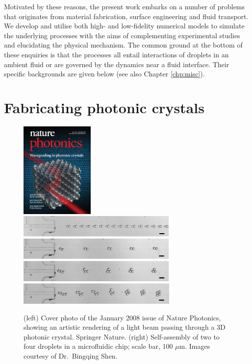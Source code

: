 Motivated by these reasons, the present work embarks on a number of problems that originates from material fabrication, surface engineering and fluid transport.
We develop and utilise both high- and low-fidelity numerical models to simulate the underlying processes with the aims of complementing experimental studies and elucidating the physical mechanism.
The common ground at the bottom of these enquiries is that the processes all entail interactions of droplets in an ambient fluid or are governed by the dynamics near a fluid interface.
Their specific backgrounds are given below (see also Chapter \ref{chp:misc}).



\section{Fabricating photonic crystals}

\begin{figure}%
  \centering
  \includegraphics[height=4.73cm]{photonics_cover.jpg}
  \includegraphics[height=4.73cm]{flow-assist1.png}
  \caption{(left) Cover photo of the January 2008 issue of Nature Photonics, showing an artistic rendering of a light beam passing through a 3D photonic crystal. \textcopyright \enspace Springer Nature. (right) Self-assembly of two to four droplets in a microfluidic chip; scale bar, 100 $\mu$m. Images courtesy of Dr.\ Bingqing Shen.}
  \label{fig:photonic-flow}
\end{figure}

